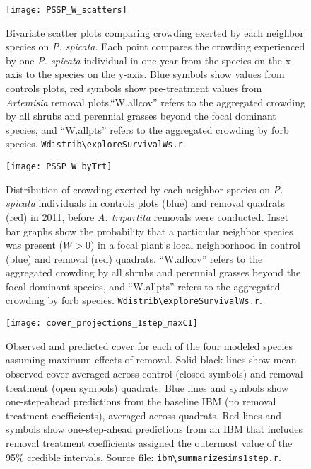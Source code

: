\documentclass[11pt]{article}
\begin{document}
  \begin{figure}[tbp]
  \centering
  \texttt{[image: PSSP\_W\_scatters]}
  \caption{Bivariate scatter plots comparing crowding exerted by each neighbor species on \textit{P. spicata}. Each point compares the crowding experienced by one \textit{P. spicata} individual in one year from the species on the x-axis to the species on the y-axis.   Blue symbols show values from controls plots, red symbols show pre-treatment values from \textit{Artemisia} removal plots.``W.allcov'' refers to the aggregated crowding by all shrubs and perennial grasses beyond the focal dominant species, and ``W.allpts'' refers to the aggregated crowding by forb species.  \texttt{Wdistrib\textbackslash exploreSurvivalWs.r}. }
  \label{fig:Wscatters}
  \end{figure}
  
  \begin{figure}[tbp]
 \centering
 \texttt{[image: PSSP\_W\_byTrt]}
 \caption{Distribution of crowding exerted by each neighbor species on \textit{P. spicata} individuals in controls plots (blue) and removal quadrats (red) in 2011, before \textit{A. tripartita}  removals were conducted. Inset bar graphs show the probability that a particular neighbor species was present ($W>0$) in a focal plant's local neighborhood in control (blue) and removal (red) quadrats. ``W.allcov'' refers to the aggregated crowding by all shrubs and perennial grasses beyond the focal dominant species, and ``W.allpts'' refers to the aggregated crowding by forb species.  \texttt{Wdistrib\textbackslash exploreSurvivalWs.r}. }
 \label{fig:W-by-treatment}
 \end{figure}
 

 \begin{figure}[tbp]
 \centering
 \texttt{[image: cover\_projections\_1step\_maxCI]}
 \caption{Observed and predicted cover for each of the four modeled species assuming maximum effects of removal. 
  Solid black lines show mean observed cover averaged across control (closed symbols) and removal treatment (open symbols) quadrats. Blue lines and symbols show one-step-ahead predictions from the baseline IBM (no removal treatment coefficients), averaged across quadrats. Red lines and symbols show one-step-ahead predictions from an IBM that includes removal treatment coefficients assigned the outermost value of the 95\% credible intervals. 
  Source file: \texttt{ibm\textbackslash summarize\textunderscore sims1step.r}. }
 \label{fig:IBM1step-maxCI}
 \end{figure}
 
\end{document}
